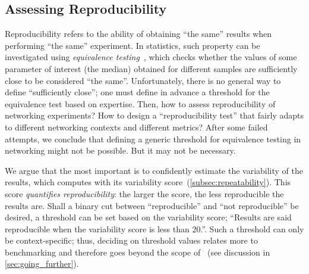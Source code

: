 \subsection{Assessing Reproducibility}
\label{subsec:reproducibility}

Reproducibility refers to the ability of obtaining ``the same'' results when performing ``the same'' experiment.
In statistics, such property can be investigated using \textit{equivalence testing}~\cite{lakens2017Equivalence}, which checks whether the values of some parameter of interest (\eg the median) obtained for different samples are sufficiently close to be considered ``the same''.
Unfortunately, there is no general way to define ``sufficiently close''; one must define in advance a threshold for the equivalence test based on expertise.
Then, how to assess reproducibility of networking experiments? How to design a ``reproducibility test'' that fairly adapts to different networking contexts and different metrics?
After some failed attempts, we conclude that defining a generic threshold for equivalence testing in networking might not be possible. But it may not be necessary.

We argue that the most important is to confidently estimate the variability of the results, which \triscale computes with its variability score~(\cref{subsec:repeatability}).
This score \emph{quantifies reproducibility}: the larger the score, the less reproducible the results are.
Shall a binary cut between ``reproducible'' and ``not reproducible'' be desired, a threshold can be set based on the variability score; \eg ``Results are said reproducible when the variability score is less than 20\mbps.''.
Such a threshold can only be context-specific; thus, deciding on threshold values relates more to benchmarking and therefore goes beyond the scope of \triscale~(see discussion in \cref{sec:going_further}).
